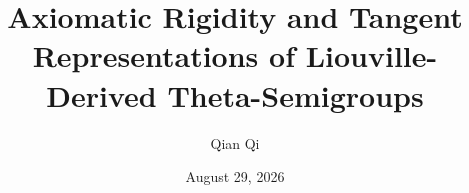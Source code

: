 \documentclass[11pt,reqno]{amsart}
\title[Rigidity and tangent laws for Sinai theta-semigroups]{Axiomatic Rigidity and Tangent Representations of Liouville-Derived Theta-Semigroups}
\author{Qian Qi}
\date{August 29, 2026}
\theoremstyle{definition}
\theoremstyle{remark}
\begin{document}
\raggedbottom



\end{document}
